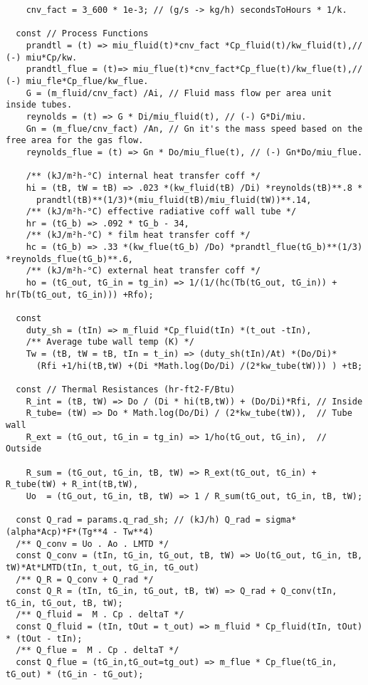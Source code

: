 \begin{verbatim}
    cnv_fact = 3_600 * 1e-3; // (g/s -> kg/h) secondsToHours * 1/k.

  const // Process Functions
    prandtl = (t) => miu_fluid(t)*cnv_fact *Cp_fluid(t)/kw_fluid(t),// (-) miu*Cp/kw.
    prandtl_flue = (t)=> miu_flue(t)*cnv_fact*Cp_flue(t)/kw_flue(t),// (-) miu_fle*Cp_flue/kw_flue.
    G = (m_fluid/cnv_fact) /Ai, // Fluid mass flow per area unit inside tubes.
    reynolds = (t) => G * Di/miu_fluid(t), // (-) G*Di/miu.
    Gn = (m_flue/cnv_fact) /An, // Gn it's the mass speed based on the free area for the gas flow.
    reynolds_flue = (t) => Gn * Do/miu_flue(t), // (-) Gn*Do/miu_flue.
      
    /** (kJ/m²h-°C) internal heat transfer coff */
    hi = (tB, tW = tB) => .023 *(kw_fluid(tB) /Di) *reynolds(tB)**.8 *
      prandtl(tB)**(1/3)*(miu_fluid(tB)/miu_fluid(tW))**.14,
    /** (kJ/m²h-°C) effective radiative coff wall tube */
    hr = (tG_b) => .092 * tG_b - 34,
    /** (kJ/m²h-°C) * film heat transfer coff */
    hc = (tG_b) => .33 *(kw_flue(tG_b) /Do) *prandtl_flue(tG_b)**(1/3) *reynolds_flue(tG_b)**.6,
    /** (kJ/m²h-°C) external heat transfer coff */
    ho = (tG_out, tG_in = tg_in) => 1/(1/(hc(Tb(tG_out, tG_in)) + hr(Tb(tG_out, tG_in))) +Rfo);
  
  const
    duty_sh = (tIn) => m_fluid *Cp_fluid(tIn) *(t_out -tIn),
    /** Average tube wall temp (K) */
    Tw = (tB, tW = tB, tIn = t_in) => (duty_sh(tIn)/At) *(Do/Di)*
      (Rfi +1/hi(tB,tW) +(Di *Math.log(Do/Di) /(2*kw_tube(tW))) ) +tB;

  const // Thermal Resistances (hr-ft2-F/Btu)
    R_int = (tB, tW) => Do / (Di * hi(tB,tW)) + (Do/Di)*Rfi, // Inside
    R_tube= (tW) => Do * Math.log(Do/Di) / (2*kw_tube(tW)),  // Tube wall
    R_ext = (tG_out, tG_in = tg_in) => 1/ho(tG_out, tG_in),  // Outside
    
    R_sum = (tG_out, tG_in, tB, tW) => R_ext(tG_out, tG_in) + R_tube(tW) + R_int(tB,tW),
    Uo  = (tG_out, tG_in, tB, tW) => 1 / R_sum(tG_out, tG_in, tB, tW);
  
  const Q_rad = params.q_rad_sh; // (kJ/h) Q_rad = sigma*(alpha*Acp)*F*(Tg**4 - Tw**4)
  /** Q_conv = Uo . Ao . LMTD */
  const Q_conv = (tIn, tG_in, tG_out, tB, tW) => Uo(tG_out, tG_in, tB, tW)*At*LMTD(tIn, t_out, tG_in, tG_out)
  /** Q_R = Q_conv + Q_rad */
  const Q_R = (tIn, tG_in, tG_out, tB, tW) => Q_rad + Q_conv(tIn, tG_in, tG_out, tB, tW);
  /** Q_fluid =  M . Cp . deltaT */
  const Q_fluid = (tIn, tOut = t_out) => m_fluid * Cp_fluid(tIn, tOut) * (tOut - tIn);
  /** Q_flue =  M . Cp . deltaT */
  const Q_flue = (tG_in,tG_out=tg_out) => m_flue * Cp_flue(tG_in, tG_out) * (tG_in - tG_out);
  

\end{verbatim}
